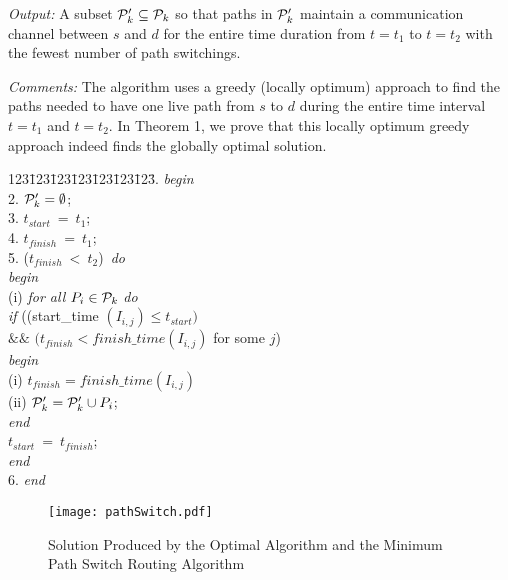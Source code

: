 \documentclass[10pt]{IEEEtran}
\begin{document}
\vspace{0.1in}
\noindent
{\it Output:} A subset ${\cal P}'_k \subseteq {\cal P}_k$ so that paths in ${\cal P}'_k$ maintain a communication channel between $s$ and $d$ for the entire time duration from $t = t_1$ to $t = t_2$ with the fewest number of path switchings.

\vspace{0.1in}
\noindent
{\it Comments:} The algorithm uses a greedy (locally optimum) approach to find the paths needed to  have one live path from $s$ to $d$ during the entire time interval $t = t_1$ and $t = t_2$. In Theorem 1, we prove that this locally optimum greedy approach indeed finds the globally optimal solution.

\vspace{0.1 in}
\begin{tabbing}
123\=123\=123\=123\=123\=123\=123\= . {\em begin}\\
2. \> ${\cal P}'_k = \emptyset$;\\
3. \> $t_{start}~=~t_1$;\\
4. \> $t_{finish}~=~t_1$;\\
5.  ($t_{finish}~<~t_2$)~{\em do} \\
\> \> {\em begin}\\
\> \> \>  (i) {\em for all} $P_i \in {\cal P}_k $ {\em do}\\
\> \> \> \>  {\em if} ((start\_time $(I_{i,j}) \leq t_{start})$ \\
\> \> \> \>  {\em $\&\&$} $(t_{finish} < finish\_time(I_{i,j})$ for some $j$)\\
\> \> \> \> \>  {\em begin}\\
\> \> \>  \> \> \> (i) $t_{finish} = finish\_time(I_{i,j})$\\
\> \> \>  \> \> \>    (ii) ${\cal P}'_k = {\cal P}'_k \cup P_i$;\\
\> \> \> \> \>  {\em end}\\
\> \> \>  $t_{start}~=~t_{finish}$;\\
\> \> {\em  end}\\
6. {\em end}
\end{tabbing}

\begin{figure}
\centering
\texttt{[image: pathSwitch.pdf]}
\caption{Solution Produced by the Optimal Algorithm and the Minimum Path Switch Routing Algorithm}
\label{fig:proofdiagram}
\end{figure}
\end{document}
